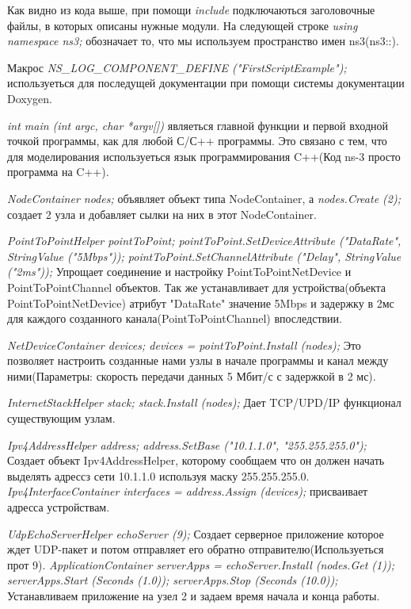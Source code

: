 \documentclass[14pt,a4paper]{article}
\begin{document}
Как видно из кода выше, при помощи \textit{include} подключаються заголовочные
файлы, в которых описаны нужные модули. На следующей строке \textit{using
namespace ns3;} обозначает то, что мы используем пространство имен ns3(ns3::).

Макрос \textit{NS\_LOG\_COMPONENT\_DEFINE ("FirstScriptExample");}
используеться для последущей документации при помощи системы документации Doxygen.

\textit{int main (int argc, char *argv[])} являеться главной функции и первой
входной точкой программы, как для любой С/С++ программы. Это связано с тем, что
для моделирования используеться язык программирования C++(Код ns-3 просто
программа на C++).

\textit{NodeContainer nodes;} объявляет объект типа NodeContainer, а
\textit{nodes.Create (2);} создает 2 узла и добавляет сылки на них в
этот NodeContainer.


\textit{PointToPointHelper pointToPoint; 
pointToPoint.SetDeviceAttribute ("DataRate", StringValue ("5Mbps")); 
pointToPoint.SetChannelAttribute ("Delay", StringValue ("2ms"));} 
Упрощает соединение и настройку PointToPointNetDevice и PointToPointChannel
объектов. Так же устанавливает для устройства(объекта PointToPointNetDevice)
атрибут "DataRate" значение 5Mbps и задержку в 2мс для каждого созданного
канала(PointToPointChannel) впоследствии.

\textit{NetDeviceContainer devices; 
devices = pointToPoint.Install (nodes);} Это позволяет настроить созданные нами
узлы в начале программы и канал между ними(Параметры: скорость передачи данных
5 Мбит/с с задержкой в 2 мс).

\textit{InternetStackHelper stack;
 stack.Install (nodes);} Дает TCP/UPD/IP функционал существующим узлам.

\textit{Ipv4AddressHelper address; 
address.SetBase ("10.1.1.0", "255.255.255.0");} Создает объект
Ipv4AddressHelper, которому сообщаем что он должен начать выделять адрессз сети
10.1.1.0 используя маску 255.255.255.0.
\textit{Ipv4InterfaceContainer interfaces = address.Assign (devices);} 
присваивает адресса устройствам.

\textit{UdpEchoServerHelper echoServer (9);} Создает серверное приложение
которое ждет UDP-пакет и потом отправляет его обратно отправителю(Используеться прот 9).
\textit{ApplicationContainer serverApps = echoServer.Install (nodes.Get (1)); serverApps.Start (Seconds (1.0));
  serverApps.Stop (Seconds (10.0));} Устанавливаем приложение на узел 2 и задаем
  время начала и конца работы.
  
\end{document}
